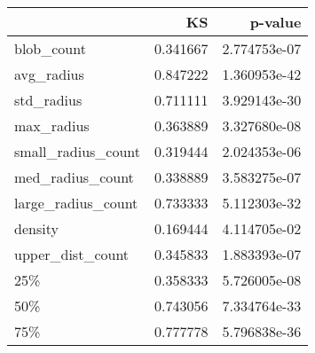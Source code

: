 \begin{tabular}{lrr}
\toprule
{} &        KS &       p-value \\
\midrule
blob\_count         &  0.341667 &  2.774753e-07 \\
avg\_radius         &  0.847222 &  1.360953e-42 \\
std\_radius         &  0.711111 &  3.929143e-30 \\
max\_radius         &  0.363889 &  3.327680e-08 \\
small\_radius\_count &  0.319444 &  2.024353e-06 \\
med\_radius\_count   &  0.338889 &  3.583275e-07 \\
large\_radius\_count &  0.733333 &  5.112303e-32 \\
density            &  0.169444 &  4.114705e-02 \\
upper\_dist\_count   &  0.345833 &  1.883393e-07 \\
25\%                &  0.358333 &  5.726005e-08 \\
50\%                &  0.743056 &  7.334764e-33 \\
75\%                &  0.777778 &  5.796838e-36 \\
\bottomrule
\end{tabular}
